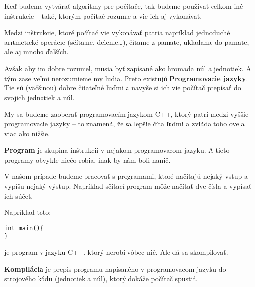 \medskip

Keď budeme vytvárať algoritmy pre počítače, tak budeme používať celkom iné
inštrukcie -- také, ktorým počítač rozumie a vie ich aj vykonávať.

Medzi inštrukcie, ktoré počítač vie vykonávať patria napríklad jednoduché
aritmetické operácie (sčítanie, delenie\dots), čítanie z pamäte, ukladanie do
pamäte, ale aj mnoho ďalších. 

Avšak aby im dobre rozumel, musia byť zapísané ako hromada núl a jednotiek. A
tým zase veľmi nerozumieme my ľudia.  Preto existujú \textbf{Programovacie
jazyky}. Tie sú (väčšinou) dobre čitateľné ľuďmi a navyše si ich vie počítač
prepísať do svojich jednotiek a núl.

My sa budeme zaoberať programovacím jazykom C++, ktorý patrí medzi vyššie
programovacie jazyky -- to znamená, že sa lepšie číta ľuďmi a zvláda toho
oveľa viac ako nižšie.

\medskip

\textbf{Program} je skupina inštrukcií v nejakom programovacom jazyku.  A tieto
programy obvykle niečo robia, inak by nám boli nanič. 

V našom prípade budeme pracovať s programami, ktoré načítajú nejaký vstup a
vypíšu nejaký výstup.  Napríklad sčítací program môže načítať dve čísla a
vypísať ich súčet.

Napríklad toto:
\begin{lstlisting}
int main(){
}
\end{lstlisting}
je program v jazyku C++, ktorý nerobí vôbec nič. Ale dá sa skompilovať. 


\textbf{Kompilácia} je prepis programu napísaného v programovacom jazyku do
strojového kódu (jednotiek a núl), ktorý dokáže počítač spustiť.


